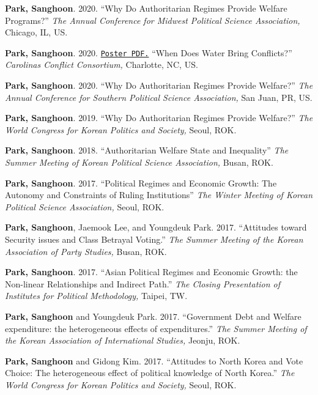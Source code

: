 \documentclass[margin,line]{res}
\begin{document}
\begin{resume}
{\bf Park, Sanghoon}. {2020.} {``Why Do Authoritarian Regimes Provide Welfare Programs?''} {\it The Annual Conference for Midwest Political Science Association,} Chicago, IL, US.

\vspace{-.25cm}
{\bf Park, Sanghoon}. {2020.} \href{https://www.dropbox.com/s/7xr90ielm1vh1sd/poster.pdf?dl=0}{\tt Poster PDF.} {``When Does Water Bring Conflicts?''} {\it Carolinas Conflict Consortium,} Charlotte, NC, US.

\vspace{-.25cm}
{\bf Park, Sanghoon}. {2020.} {``Why Do Authoritarian Regimes Provide Welfare?''} {\it The Annual Conference for Southern Political Science Association,} San Juan, PR, US.

\vspace{-.25cm}
{\bf Park, Sanghoon}. {2019.} {``Why Do Authoritarian Regimes Provide Welfare?''} {\it The World Congress for Korean Politics and Society,} Seoul, ROK.

\vspace{-.25cm}
{\bf Park, Sanghoon}. {2018.} {``Authoritarian Welfare State and Inequality''} {\it The Summer Meeting of Korean Political Science Association,} Busan, ROK.

\vspace{-.25cm}
{\bf Park, Sanghoon}. {2017.} {``Political Regimes and Economic Growth: The Autonomy and Constraints of Ruling Institutions''} {\it The Winter Meeting of Korean Political Science Association,} Seoul, ROK.

\vspace{-.25cm}
{\bf Park, Sanghoon}, Jaemook Lee, and Youngdeuk Park. {2017.} {``Attitudes toward Security issues and Class Betrayal Voting.''} {\it The Summer Meeting of the Korean Association of Party Studies,} Busan, ROK.

\vspace{-.25cm}
{\bf Park, Sanghoon}. {2017.} {``Asian Political Regimes and Economic Growth: the Non-linear Relationships and Indirect Path.''} {\it The Closing Presentation of Institutes for Political Methodology,} Taipei, TW.

\vspace{-.25cm}
{\bf Park, Sanghoon} and Youngdeuk Park. {2017.} {``Government Debt and Welfare expenditure: the heterogeneous effects of expenditures.''} {\it The Summer Meeting of the Korean Association of International Studies,} Jeonju, ROK.

\vspace{-.25cm}
{\bf Park, Sanghoon} and Gidong Kim. {2017.} {``Attitudes to North Korea and Vote Choice: The heterogeneous effect of political knowledge of North Korea.''} {\it The World Congress for Korean Politics and Society,} Seoul, ROK.


\end{resume}
\end{document}
